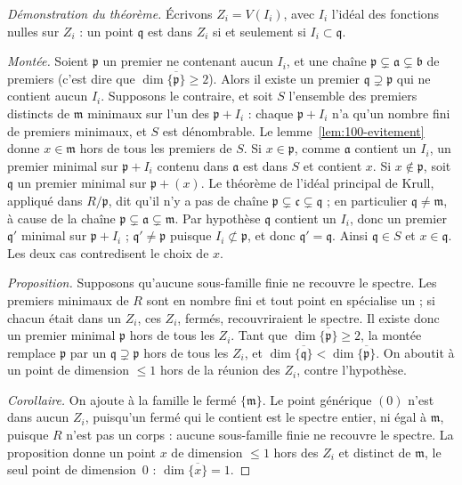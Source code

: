 \begin{proof}[Démonstration du théorème]
Écrivons $Z_i = V(I_i)$, avec $I_i$ l'idéal des fonctions nulles sur $Z_i$ : un point $\mathfrak q$ est dans $Z_i$ si et seulement si $I_i \subset \mathfrak q$.

\emph{Montée.} Soient $\mathfrak p$ un premier ne contenant aucun $I_i$, et une chaîne $\mathfrak p \subsetneq \mathfrak a \subsetneq \mathfrak b$ de premiers (c'est dire que $\dim \overline{\{\mathfrak p\}} \geq 2$). Alors il existe un premier $\mathfrak q \supsetneq \mathfrak p$ qui ne contient aucun $I_i$. Supposons le contraire, et soit $S$ l'ensemble des premiers distincts de $\mathfrak m$ minimaux sur l'un des $\mathfrak p + I_i$ : chaque $\mathfrak p + I_i$ n'a qu'un nombre fini de premiers minimaux, et $S$ est dénombrable. Le lemme~\ref{lem:100-evitement} donne $x \in \mathfrak m$ hors de tous les premiers de $S$. Si $x \in \mathfrak p$, comme $\mathfrak a$ contient un $I_i$, un premier minimal sur $\mathfrak p + I_i$ contenu dans $\mathfrak a$ est dans $S$ et contient $x$. Si $x \notin \mathfrak p$, soit $\mathfrak q$ un premier minimal sur $\mathfrak p + (x)$. Le théorème de l'idéal principal de Krull, appliqué dans $R/\mathfrak p$, dit qu'il n'y a pas de chaîne $\mathfrak p \subsetneq \mathfrak c \subsetneq \mathfrak q$ ; en particulier $\mathfrak q \neq \mathfrak m$, à cause de la chaîne $\mathfrak p \subsetneq \mathfrak a \subsetneq \mathfrak m$. Par hypothèse $\mathfrak q$ contient un $I_i$, donc un premier $\mathfrak q'$ minimal sur $\mathfrak p + I_i$ ; $\mathfrak q' \neq \mathfrak p$ puisque $I_i \not\subset \mathfrak p$, et donc $\mathfrak q' = \mathfrak q$. Ainsi $\mathfrak q \in S$ et $x \in \mathfrak q$. Les deux cas contredisent le choix de $x$.

\emph{Proposition.} Supposons qu'aucune sous-famille finie ne recouvre le spectre. Les premiers minimaux de $R$ sont en nombre fini et tout point en spécialise un ; si chacun était dans un $Z_i$, ces $Z_i$, fermés, recouvriraient le spectre. Il existe donc un premier minimal $\mathfrak p$ hors de tous les $Z_i$. Tant que $\dim \overline{\{\mathfrak p\}} \geq 2$, la montée remplace $\mathfrak p$ par un $\mathfrak q \supsetneq \mathfrak p$ hors de tous les $Z_i$, et $\dim \overline{\{\mathfrak q\}} < \dim \overline{\{\mathfrak p\}}$. On aboutit à un point de dimension $\leq 1$ hors de la réunion des $Z_i$, contre l'hypothèse.

\emph{Corollaire.} On ajoute à la famille le fermé $\{\mathfrak m\}$. Le point générique $(0)$ n'est dans aucun $Z_i$, puisqu'un fermé qui le contient est le spectre entier, ni égal à $\mathfrak m$, puisque $R$ n'est pas un corps : aucune sous-famille finie ne recouvre le spectre. La proposition donne un point $x$ de dimension $\leq 1$ hors des $Z_i$ et distinct de $\mathfrak m$, le seul point de dimension~$0$ : $\dim \overline{\{x\}} = 1$.
\end{proof}

